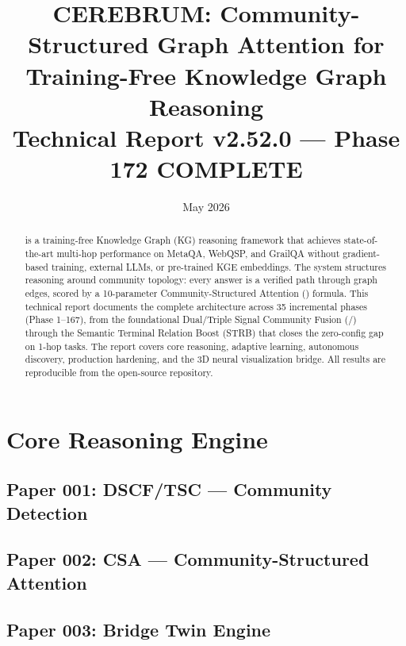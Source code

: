 \documentclass[12pt,a4paper]{article}
\title{
  \textbf{CEREBRUM: Community-Structured Graph Attention for\\
  Training-Free Knowledge Graph Reasoning} \\[0.5em]
  \large Technical Report v2.52.0 — Phase 172 COMPLETE
}
\date{May 2026}
\begin{document}
\maketitle
\thispagestyle{empty}

\begin{abstract}
\CEREBRUM{} is a training-free Knowledge Graph (KG) reasoning framework that
achieves state-of-the-art multi-hop performance on MetaQA, WebQSP, and GrailQA
without gradient-based training, external LLMs, or pre-trained KGE embeddings.
The system structures reasoning around community topology: every answer is a
verified path through graph edges, scored by a 10-parameter Community-Structured
Attention (\CSA{}) formula. This technical report documents the complete
architecture across 35 incremental phases (Phase 1–167), from the foundational
Dual/Triple Signal Community Fusion (\DSCF{}/\TSC{}) through the
Semantic Terminal Relation Boost (\textsc{STRB}) that closes the zero-config gap
on 1-hop tasks. The report covers core reasoning, adaptive learning, autonomous
discovery, production hardening, and the 3D neural visualization bridge.
All results are reproducible from the open-source repository.
\end{abstract}

\newpage
\tableofcontents
\newpage

\part{Core Reasoning Engine}

\chapter*{Paper 001: DSCF/TSC — Community Detection}


\chapter*{Paper 002: CSA — Community-Structured Attention}


\chapter*{Paper 003: Bridge Twin Engine}

\end{document}
